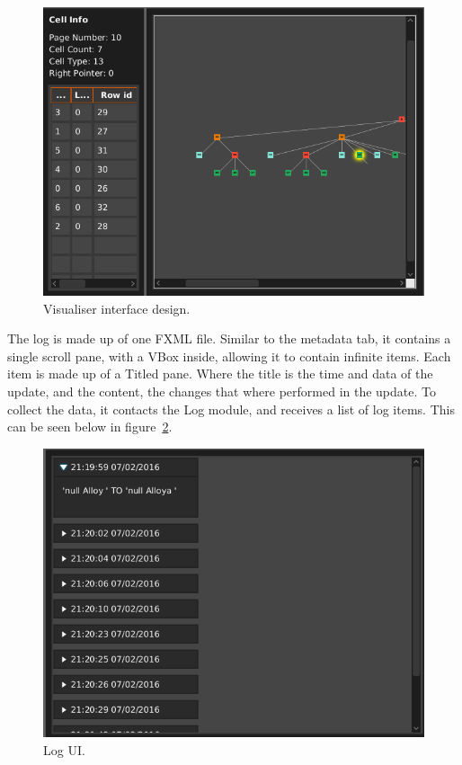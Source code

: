 \begin{figure}[H]
	\centering
	\includegraphics[scale=0.32]{images/ui_visuliser_final.png}
	\caption{Visualiser interface design.}
	\label{fig:imp_ui_vis}
\end{figure}

The log is made up of one FXML file. Similar to the metadata tab, it contains a single scroll pane, with a VBox inside, allowing it to contain infinite items. Each item is made up of a Titled pane. Where the title is the time and data of the update, and the content, the changes that where performed in the update. To collect the data, it contacts the Log module, and receives a list of log items. This can be seen below in figure~\ref{fig:imp_ui_log}.

\begin{figure}[H]
	\centering
	\includegraphics[scale=0.32]{images/ui_log_final.png}
	\caption{Log UI.}
	\label{fig:imp_ui_log}
\end{figure}
